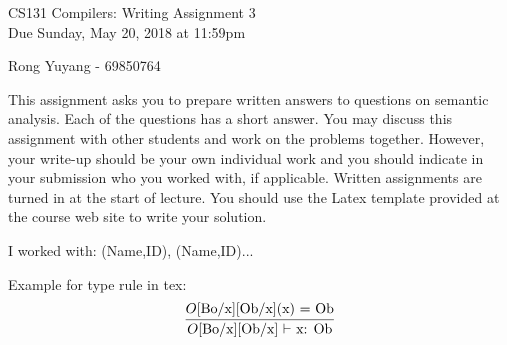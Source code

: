 \documentclass[10pt]{article}
\newcommand{\infertext}[2]{\infer{{\textrm{#1}}}{#2}}
\begin{document}
\begin{center}
\Large CS131 Compilers: Writing Assignment 3\\Due Sunday, May 20, 2018 at 11:59pm
\end{center}

\begin{center}
\LARGE Rong Yuyang - 69850764
\end{center}

This assignment asks you to prepare written answers to questions on
semantic analysis. Each of the questions has a short answer. You
may discuss this assignment with other students and work on the problems
together. However, your write-up should be your own individual work
and you should indicate in your submission who you worked with, if applicable.
Written assignments are turned in at the start of lecture.
You should use the Latex template provided
at the course web site to write your solution.


\begin{center}
I worked with: (Name,ID), (Name,ID)...
\end{center}

Example for type rule in tex:
\[\infertext
          {$O$[Bo/x][Ob/x] $\vdash$ x: Ob}
          {\textrm{$O$[Bo/x][Ob/x](x) = Ob}}
\]
\end{document}
